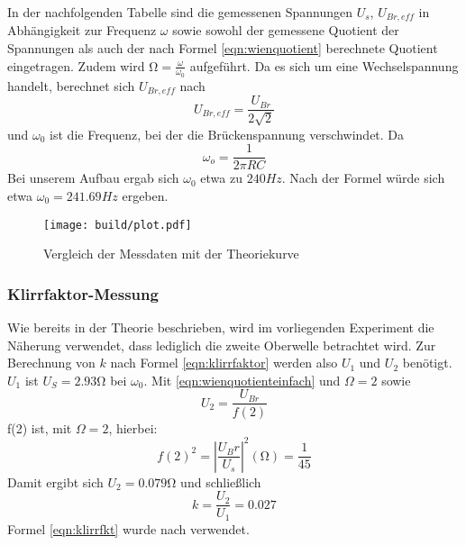 In der nachfolgenden Tabelle sind die gemessenen Spannungen $U_s$, $U_{Br, eff}$ in Abhängigkeit zur Frequenz
$\omega$ sowie sowohl der gemessene Quotient der Spannungen als auch der nach
Formel \eqref{eqn:wienquotient} berechnete Quotient eingetragen. Zudem wird $\si{\ohm} =\frac{\omega}{\omega_0}$ aufgeführt.
Da es sich um eine Wechselspannung handelt, berechnet sich $U_{Br, eff}$ nach
\begin{equation}
	U_{Br, eff}=\frac{U_{Br}}{2 \sqrt{2}}
\end{equation}
und $\omega_0$ ist die Frequenz, bei der die Brückenspannung verschwindet.
Da
\begin{equation}
	\omega_o=\frac{1}{2\pi RC}
\end{equation}
Bei unserem Aufbau ergab sich $\omega_0$ etwa zu $240Hz$. Nach der Formel würde sich etwa $\omega_0=241.69Hz$ ergeben.

\begin{figure}
	\texttt{[image: build/plot.pdf]}
	\caption{Vergleich der Messdaten mit der Theoriekurve}
	\label{fig:plot1}
\end{figure}
\subsubsection{Klirrfaktor-Messung}
Wie bereits in der Theorie beschrieben, wird im vorliegenden Experiment die Näherung
verwendet, dass lediglich die zweite Oberwelle betrachtet wird.
Zur Berechnung von $k$ nach Formel \eqref{eqn:klirrfaktor} werden also $U_1$ und $U_2$ benötigt. $U_1$ ist $U_S=2.93 \si{\ohm}$ bei $\omega_0$. Mit \eqref{eqn:wienquotienteinfach} und $\Omega=2$ sowie
\begin{equation}
	\label{eqn:klirrfkt}
U_2=\frac{U_{Br}}{f(2)}
\end{equation}
f(2) ist, mit $\Omega=2$, hierbei:
\begin{equation}
f(2)^2=\left|\frac{U_Br}{U_s}\right|^2(\si{\ohm})=\frac{1}{45}
\end{equation}
Damit ergibt sich $U_2=0.079 \si{\ohm}$ und schließlich
\begin{equation}
k=\frac{U_2}{U_1}=0.027
\end{equation}
Formel \eqref{eqn:klirrfkt} wurde nach \cite{Anleitung} verwendet.
